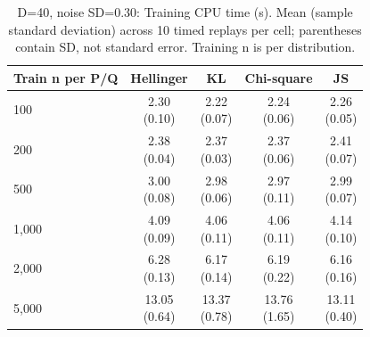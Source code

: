 \begin{table}[t]
\centering
\small
\setlength{\tabcolsep}{4pt}
\caption{D=40, noise SD=0.30: Training CPU time (s). Mean (sample standard deviation) across 10 timed replays per cell; parentheses contain SD, not standard error. Training n is per distribution.}
\label{tab:sim-d-40-noise-sd-0-30-training-cpu-time-s}
\begin{tabular}{lcccc}
\toprule
Train n per P/Q & Hellinger & KL & Chi-square & JS \\
\midrule
100 & \shortstack{2.30\\(0.10)} & \shortstack{2.22\\(0.07)} & \shortstack{2.24\\(0.06)} & \shortstack{2.26\\(0.05)} \\
200 & \shortstack{2.38\\(0.04)} & \shortstack{2.37\\(0.03)} & \shortstack{2.37\\(0.06)} & \shortstack{2.41\\(0.07)} \\
500 & \shortstack{3.00\\(0.08)} & \shortstack{2.98\\(0.06)} & \shortstack{2.97\\(0.11)} & \shortstack{2.99\\(0.07)} \\
1,000 & \shortstack{4.09\\(0.09)} & \shortstack{4.06\\(0.11)} & \shortstack{4.06\\(0.11)} & \shortstack{4.14\\(0.10)} \\
2,000 & \shortstack{6.28\\(0.13)} & \shortstack{6.17\\(0.14)} & \shortstack{6.19\\(0.22)} & \shortstack{6.16\\(0.16)} \\
5,000 & \shortstack{13.05\\(0.64)} & \shortstack{13.37\\(0.78)} & \shortstack{13.76\\(1.65)} & \shortstack{13.11\\(0.40)} \\
\bottomrule
\end{tabular}
\end{table}

